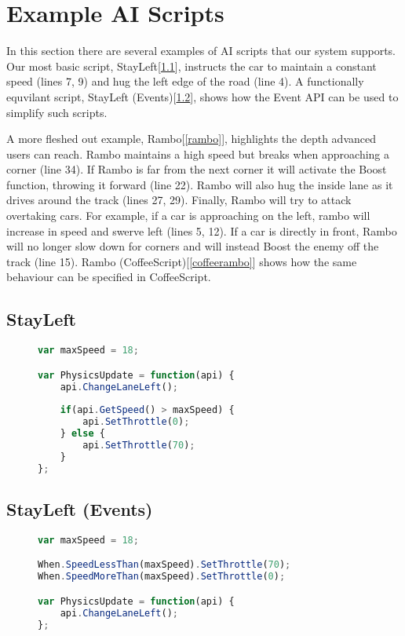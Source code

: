 \section{Example AI Scripts}
In this section there are several examples of AI scripts that our system supports. Our most basic script, StayLeft[\ref{jsbasic}], instructs the car to maintain a constant speed (lines 7, 9) and hug the left edge of the road (line 4). A functionally equvilant script, StayLeft (Events)[\ref{jsevents}], shows how the Event API can be used to simplify such scripts. 

A more fleshed out example, Rambo[\ref{rambo}], highlights  the depth advanced users can reach. Rambo maintains a high speed but breaks when approaching a corner (line 34). If Rambo is far from the next corner it will activate the Boost function, throwing it forward (line 22). Rambo will also hug the inside lane as it drives around the track (lines 27, 29). Finally, Rambo will try to attack overtaking cars. For example, if a car is approaching on the left, rambo will increase in speed and swerve left (lines 5, 12). If a car is directly in front, Rambo will no longer slow down for corners and will instead Boost the enemy off the track (line 15). Rambo (CoffeeScript)[\ref{coffeerambo}] shows how the same behaviour can be specified in CoffeeScript.


\subsection{StayLeft}
\label{jsbasic}
\begin{figure}[H]
\begin{lstlisting}[language=JavaScript]
var maxSpeed = 18;

var PhysicsUpdate = function(api) {
    api.ChangeLaneLeft();
    
    if(api.GetSpeed() > maxSpeed) {
        api.SetThrottle(0);
    } else {
        api.SetThrottle(70);
    }
};
\end{lstlisting}
\end{figure}

\subsection{StayLeft (Events)}
\label{jsevents}
\begin{figure}[H]
\begin{lstlisting}[language=JavaScript]
var maxSpeed = 18;

When.SpeedLessThan(maxSpeed).SetThrottle(70);
When.SpeedMoreThan(maxSpeed).SetThrottle(0);

var PhysicsUpdate = function(api) {
    api.ChangeLaneLeft();
};
\end{lstlisting}
\end{figure}

